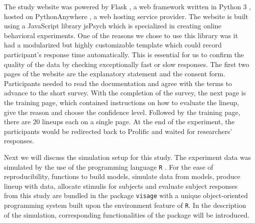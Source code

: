 \documentclass{monashthesis}
\begin{document}
\begin{table}

\caption{\label{tab:lineupreason}Explanations about reasons for choosing data plots from a lineup}
\centering
{}
\end{table}

The study website was powered by Flask \autocite{grinberg_flask_2018}, a web framework written in Python 3 \autocite{van_rossum_python_2009}, hosted on PythonAnywhere \autocite{pythonanywhere_pythonanywhere_2022}, a web hosting service provider. The website is built using a JavaScript \autocite{flanagan_javascript_2006} library jsPsych \autocite{de_leeuw_jspsych_2015} which is specialized in creating online behavioral experiments. One of the reasons we chose to use this library was it had a modularized but highly customizable template which could record participant's response time automatically. This is essential for us to confirm the quality of the data by checking exceptionally fast or slow responses. The first two pages of the website are the explanatory statement and the consent form. Participants needed to read the documentation and agree with the terms to advance to the short survey. With the completion of the survey, the next page is the training page, which contained instructions on how to evaluate the lineup, give the reason and choose the confidence level. Followed by the training page, there are 20 lineups each on a single page. At the end of the experiment, the participants would be redirected back to Prolific and waited for researchers' responses.

Next we will discuss the simulation setup for this study. The experiment data was simulated by the use of the programming language \texttt{R} \autocite{r_core_team_r_2021}. For the ease of reproducibility, functions to build models, simulate data from models, produce lineup with data, allocate stimulis for subjects and evaluate subject responses from this study are bundled in the package \texttt{visage} with a unique object-oriented programming system built upon the environment feature of \texttt{R}. In the description of the simulation, corresponding functionalities of the package will be introduced.
\end{document}
